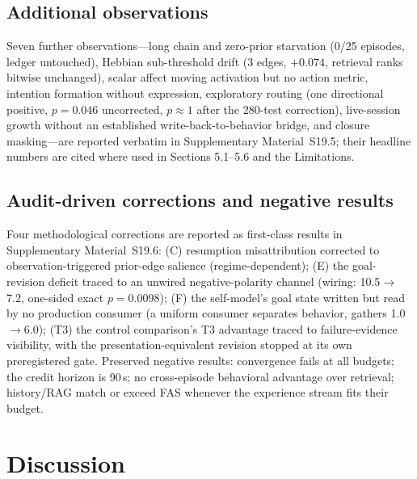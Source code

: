\documentclass[10pt]{article}
\begin{document}
\subsection{Additional observations}
\label{sec:res-system}
Seven further observations---long chain and zero-prior starvation (0/25 episodes, ledger untouched), Hebbian sub-threshold drift (3 edges, $+0.074$, retrieval ranks bitwise unchanged), scalar affect moving activation but no action metric, intention formation without expression, exploratory routing (one directional positive, $p{=}0.046$ uncorrected, $p{\approx}1$ after the 280-test correction), live-session growth without an established write-back-to-behavior bridge, and closure masking---are reported verbatim in Supplementary Material~S19.5; their headline numbers are cited where used in Sections 5.1--5.6 and the Limitations.

\subsection{Audit-driven corrections and negative results}
\label{sec:audit-negative}
Four methodological corrections are reported as first-class results in Supplementary Material~S19.6: (C) resumption misattribution corrected to observation-triggered prior-edge salience (regime-dependent); (E) the goal-revision deficit traced to an unwired negative-polarity channel (wiring: 10.5$\rightarrow$7.2, one-sided exact $p{=}0.0098$); (F) the self-model's goal state written but read by no production consumer (a uniform consumer separates behavior, gathers 1.0$\rightarrow$6.0); (T3) the control comparison's T3 advantage traced to failure-evidence visibility, with the presentation-equivalent revision stopped at its own preregistered gate. Preserved negative results: convergence fails at all budgets; the credit horizon is 90\,s; no cross-episode behavioral advantage over retrieval; history/RAG match or exceed FAS whenever the experience stream fits their budget.

\section{Discussion}
\label{sec:discussion}
\end{document}
